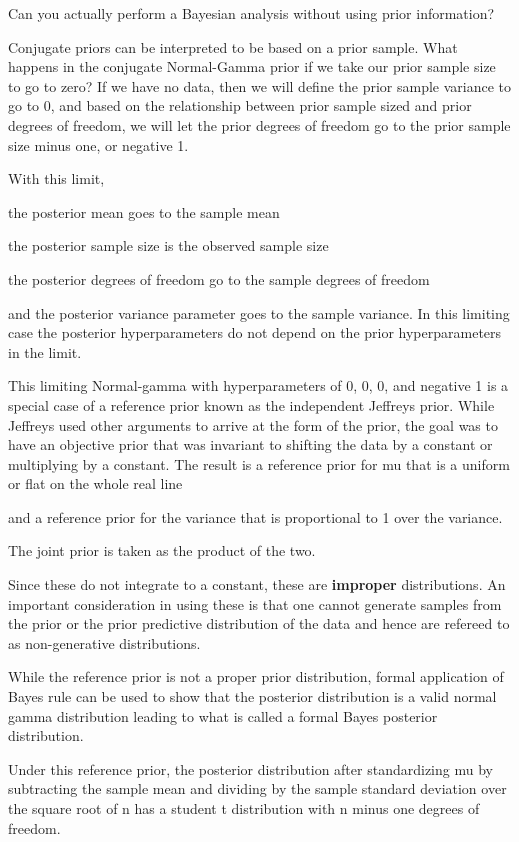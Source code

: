 \documentclass[]{book}
\theoremstyle{definition}
\theoremstyle{definition}
\theoremstyle{definition}
\theoremstyle{remark}
\begin{document}
Can you actually perform a Bayesian analysis without using prior
information?

Conjugate priors can be interpreted to be based on a prior sample. What
happens in the conjugate Normal-Gamma prior if we take our prior sample
size to go to zero? If we have no data, then we will define the prior
sample variance to go to 0, and based on the relationship between prior
sample sized and prior degrees of freedom, we will let the prior degrees
of freedom go to the prior sample size minus one, or negative 1.

With this limit,

the posterior mean goes to the sample mean

the posterior sample size is the observed sample size

the posterior degrees of freedom go to the sample degrees of freedom

and the posterior variance parameter goes to the sample variance. In
this limiting case the posterior hyperparameters do not depend on the
prior hyperparameters in the limit.

This limiting Normal-gamma with hyperparameters of 0, 0, 0, and negative
1 is a special case of a reference prior known as the independent
Jeffreys prior. While Jeffreys used other arguments to arrive at the
form of the prior, the goal was to have an objective prior that was
invariant to shifting the data by a constant or multiplying by a
constant. The result is a reference prior for mu that is a uniform or
flat on the whole real line

and a reference prior for the variance that is proportional to 1 over
the variance.

The joint prior is taken as the product of the two.

Since these do not integrate to a constant, these are \textbf{improper}
distributions. An important consideration in using these is that one
cannot generate samples from the prior or the prior predictive
distribution of the data and hence are refereed to as non-generative
distributions.

While the reference prior is not a proper prior distribution, formal
application of Bayes rule can be used to show that the posterior
distribution is a valid normal gamma distribution leading to what is
called a formal Bayes posterior distribution.

Under this reference prior, the posterior distribution after
standardizing mu by subtracting the sample mean and dividing by the
sample standard deviation over the square root of n has a student t
distribution with n minus one degrees of freedom.
\end{document}
